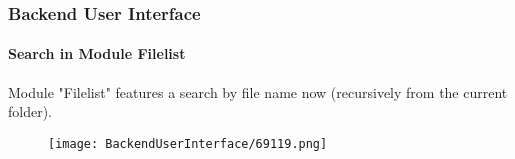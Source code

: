 \begin{frame}[fragile]
	\frametitle{Backend User Interface}
	\framesubtitle{Search in Module Filelist}

	Module "Filelist" features a search by file name now (recursively from the
	current folder).

	\begin{figure}
		\texttt{[image: BackendUserInterface/69119.png]}
	\end{figure}

\end{frame}

